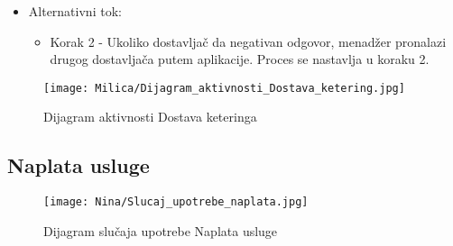 \documentclass[a4paper]{article}
\begin{document}
      \begin{itemize}
        \item Alternativni tok:
          \begin{itemize}
        \item Korak 2 - Ukoliko dostavljač da negativan odgovor, menadžer pronalazi drugog dostavljača putem aplikacije. Proces se nastavlja u koraku 2.
    \end{itemize}
    \end{itemize}
    
\begin{figure}[H]
    \centering
    \texttt{[image: Milica/Dijagram\_aktivnosti\_Dostava\_ketering.jpg]}
    \caption{Dijagram aktivnosti Dostava keteringa}
    \label{fig:RegistracijaZ}
\end{figure}



\subsection{Naplata usluge}

\begin{figure}[H]
    \centering
    \texttt{[image: Nina/Slucaj\_upotrebe\_naplata.jpg]}
    \caption{Dijagram slučaja upotrebe Naplata usluge}
    \label{fig:RegistracijaZ}
\end{figure}
\end{document}
